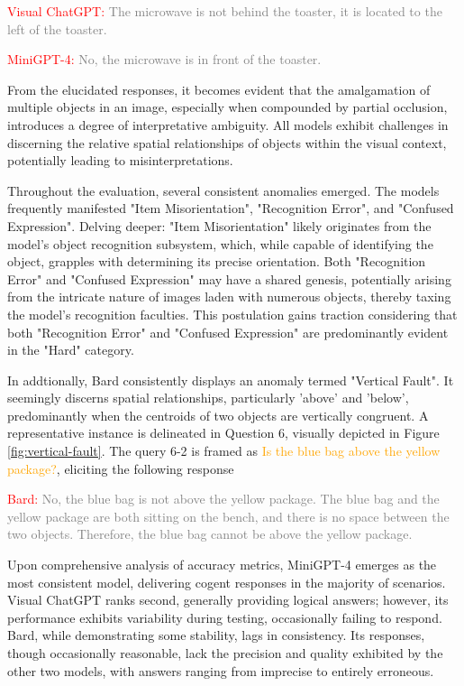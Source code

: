 \documentclass[twocolumn,11pt]{report}
\begin{document}
\textcolor{red}{Visual ChatGPT:} \textcolor{gray}{The microwave is not behind the toaster, it is located to the left of the toaster.}

\textcolor{red}{MiniGPT-4:} \textcolor{gray}{No, the microwave is in front of the toaster.}

From the elucidated responses, it becomes evident that the amalgamation of multiple objects in an image, especially when compounded by partial occlusion, introduces a degree of interpretative ambiguity. All models exhibit challenges in discerning the relative spatial relationships of objects within the visual context, potentially leading to misinterpretations.

Throughout the evaluation, several consistent anomalies emerged. The models frequently manifested "Item Misorientation", "Recognition Error", and "Confused Expression". Delving deeper: "Item Misorientation" likely originates from the model's object recognition subsystem, which, while capable of identifying the object, grapples with determining its precise orientation. Both "Recognition Error" and "Confused Expression" may have a shared genesis, potentially arising from the intricate nature of images laden with numerous objects, thereby taxing the model's recognition faculties. This postulation gains traction considering that both "Recognition Error" and "Confused Expression" are predominantly evident in the "Hard" category.

In addtionally, Bard consistently displays an anomaly termed "Vertical Fault". It seemingly discerns spatial relationships, particularly 'above' and 'below', predominantly when the centroids of two objects are vertically congruent. A representative instance is delineated in Question 6, visually depicted in Figure \ref{fig:vertical-fault}. The query 6-2 is framed as \textcolor{orange}{Is the blue bag above the yellow package?}, eliciting the following response

\textcolor{red}{Bard:} \textcolor{gray}{No, the blue bag is not above the yellow package. The blue bag and the yellow package are both sitting on the bench, and there is no space between the two objects. Therefore, the blue bag cannot be above the yellow package.}

Upon comprehensive analysis of accuracy metrics, MiniGPT-4 emerges as the most consistent model, delivering cogent responses in the majority of scenarios. Visual ChatGPT ranks second, generally providing logical answers; however, its performance exhibits variability during testing, occasionally failing to respond. Bard, while demonstrating some stability, lags in consistency. Its responses, though occasionally reasonable, lack the precision and quality exhibited by the other two models, with answers ranging from imprecise to entirely erroneous.
\end{document}
